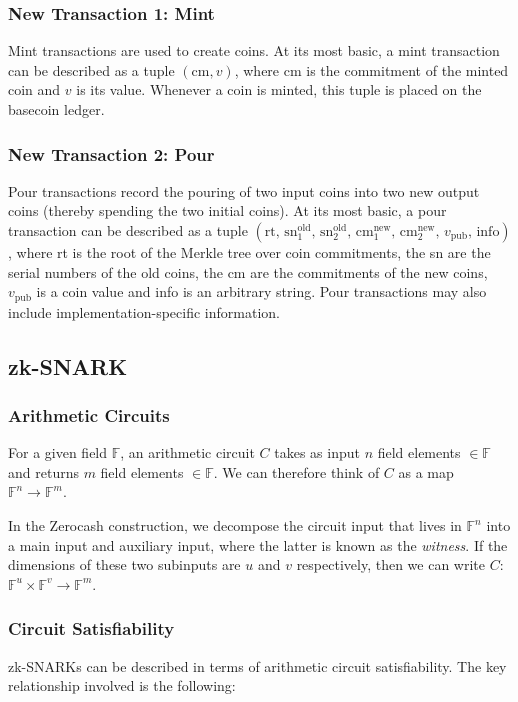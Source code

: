 \documentclass{article}
\begin{document}
\subsubsection{New Transaction 1: Mint}
Mint transactions are used to create coins. At its most basic, a mint transaction can be described as a tuple $(\text{cm}, v)$, where $\text{cm}$ is the commitment of the minted coin and $v$ is its value. Whenever a coin is minted, this tuple is placed on the basecoin ledger.

\subsubsection{New Transaction 2: Pour}
Pour transactions record the pouring of two input coins into two new output coins (thereby spending the two initial coins). At its most basic, a pour transaction can be described as a tuple $(\text{rt}, \, {\text{sn}}^{\text{old}}_1, \, {\text{sn}}^{\text{old}}_2, \, {\text{cm}}^{\text{new}}_1, \, {\text{cm}}^{\text{new}}_2, \, v_{\text{pub}}, \, \text{info})$, where rt is the root of the Merkle tree over coin commitments, the sn are the serial numbers of the old coins, the cm are the commitments of the new coins, $v_{\text{pub}}$ is a coin value and info is an arbitrary string. Pour transactions may also include implementation-specific information.

\subsection{zk-SNARK}
\subsubsection{Arithmetic Circuits}
For a given field $\mathbb{F}$, an arithmetic circuit $C$ takes as input $n$ field elements $\in \mathbb{F}$ and returns $m$ field elements $\in \mathbb{F}$. We can therefore think of $C$ as a map $\mathbb{F}^n \longrightarrow \mathbb{F}^m$.

In the Zerocash construction, we decompose the circuit input that lives in $\mathbb{F}^n$ into a main input and auxiliary input, where the latter is known as the \emph{witness}. If the dimensions of these two subinputs are $u$ and $v$ respectively, then we can write $C$: $\mathbb{F}^u \times \mathbb{F}^v \longrightarrow \mathbb{F}^m$.

\subsubsection{Circuit Satisfiability}
zk-SNARKs can be described in terms of arithmetic circuit satisfiability. The key relationship involved is the following:
\end{document}
